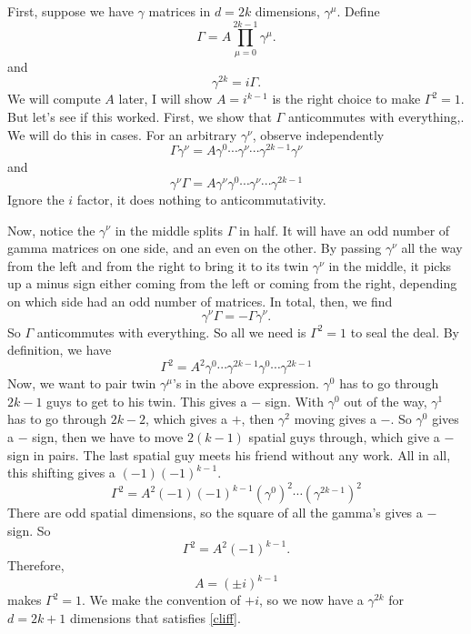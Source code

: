 \documentclass[main.tex]{subfiles}
\begin{document}
First, suppose we have $\gamma$ matrices in $d = 2k$ dimensions, $\gamma^\mu$. Define
\begin{equation} \label{g5}
\Gamma = A \prod_{\mu=0}^{2k-1} \gamma^\mu.
\end{equation}
and
\begin{equation}
\gamma^{2k} = i \Gamma.
\end{equation}
We will compute $A$ later, I will show $A = i^{k-1}$ is the right choice to make $\Gamma^2 = 1$. But let's see if  this worked. First, we show that $\Gamma$ anticommutes with everything,. We will do this in cases. For an arbitrary $\gamma^\nu$, observe independently
\begin{equation} \label{ggn}
\Gamma \gamma^\nu = A\gamma^0 \cdots \gamma^\nu \cdots \gamma^{2k-1} \gamma^\nu
\end{equation}
and
\begin{equation} \label{gng}
\gamma^\nu \Gamma = A\gamma^\nu \gamma^0 \cdots \gamma^\nu \cdots \gamma^{2k-1} 
\end{equation}
Ignore the $i$ factor, it does nothing to anticommutativity. 

Now, notice the $\gamma^\nu$ in the middle splits $\Gamma$ in half. It will have an odd number of gamma matrices on one side, and an even on the other. By passing $\gamma^\nu$ all the way from the left and from the right to bring it to its twin $\gamma^\nu$ in the middle, it picks up a minus sign either coming from the left or coming from the right, depending on which side had an odd number of matrices. In total, then, we find
\[
\gamma^\nu \Gamma = - \Gamma \gamma^\nu.
\]
So $\Gamma$ anticommutes with everything. So all we need is $\Gamma^2 = 1$ to seal the deal. By definition, we have
\[
\Gamma^2 = A^2 \gamma^0 \cdots \gamma^{2k-1} \gamma^0 \cdots \gamma^{2k-1}
\]
Now, we want to pair twin $\gamma^\mu$'s in the above expression. $\gamma^0$ has to go through $2k-1$ guys to get to his twin. This gives a $-$ sign. With $\gamma^0$ out of the way, $\gamma^1$ has to go through $2k-2$, which gives a $+$, then $\gamma^2$ moving gives a $-$. So $\gamma^0$ gives a $-$ sign, then we have to move $2(k-1)$ spatial guys through, which give a $-$ sign in pairs. The last spatial guy meets his friend without any work. All in all, this shifting gives a $(-1)(-1)^{k-1}$.
\[
\Gamma^2 = A^2 (-1) (-1)^{k-1}(\gamma^0)^2 \cdots (\gamma^{2k-1})^2
\]
There are odd spatial dimensions, so the square of all the gamma's gives a $-$ sign. So
\[
\Gamma^2 = A^2 (-1)^{k-1}.
\]
Therefore,
\[
A = (\pm i)^{k-1}
\]
makes $\Gamma^2 = 1$. We make the convention of $+i$, so we now have a $\gamma^{2k}$ for $d=2k+1$ dimensions that satisfies \ref{cliff}.
\end{document}

